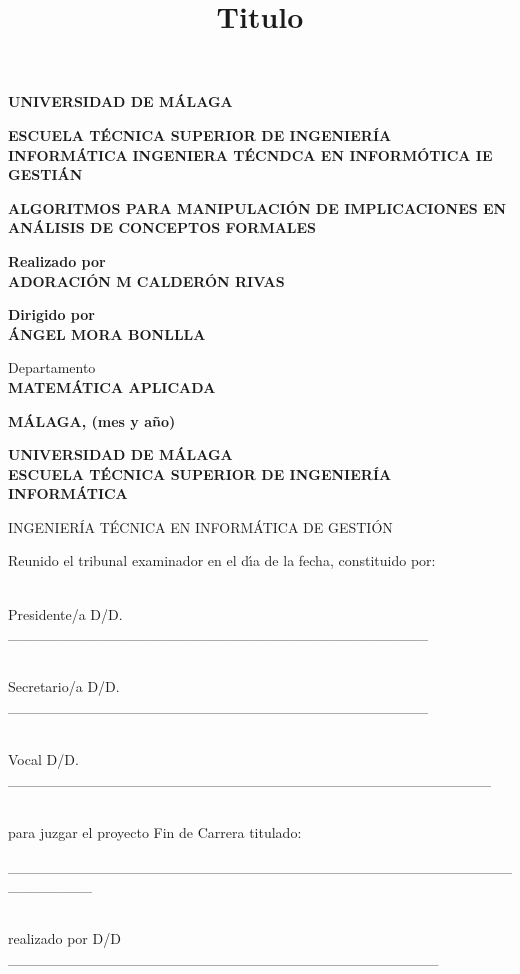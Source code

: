 \documentclass[12pt]{article}
\title{Titulo}
\begin{document}
\textbf{{\large UNIVERSIDAD DE M\'{A}LAGA}}

\textbf{ESCUELA T\'{E}CNICA SUPERIOR DE INGENIER\'{I}A INFORM\'{A}TICA}
\textbf {INGENIERA T\'{E}CNDCA EN INFORM\'{O}TICA IE GESTI\'{A}N}

\textbf{ALGORITMOS PARA MANIPULACI\'{O}N DE IMPLICACIONES EN AN\'{A}LISIS DE
CONCEPTOS FORMALES}

\textbf{Realizado por}
\\
\textbf{ADORACI\'{O}N M\textordfeminine{} CALDER\'{O}N RIVAS}

\textbf{Dirigido por}
\\
\textbf{\'{A}NGEL MORA BONLLLA}

Departamento
\\
\textbf{MATEM\'{A}TICA APLICADA}

\textbf{M\'{A}LAGA, (mes y a\~{n}o)}

\newpage

{\large \textbf{UNIVERSIDAD DE M\'{A}LAGA}
\\
\textbf{ESCUELA T\'{E}CNICA SUPERIOR DE INGENIER\'{I}A INFORM\'{A}TICA}}

INGENIER\'{I}A T\'{E}CNICA EN INFORM\'{A}TICA DE GESTI\'{O}N

Reunido el tribunal examinador en el d\'{\i}a de la fecha, constituido por:


\leavevmode \\
Presidente/a D\textordmasculine{}/D\textordfeminine{}.
\_\_\_\_\_\_\_\_\_\_\_\_\_\_\_\_\_\_\_\_\_\_\_\_\_\_\_\_\_\_\_\_\_\_\_\_\_\_\_\_


\leavevmode \\
Secretario/a D\textordmasculine{}/D\textordfeminine{}.
\_\_\_\_\_\_\_\_\_\_\_\_\_\_\_\_\_\_\_\_\_\_\_\_\_\_\_\_\_\_\_\_\_\_\_\_\_\_\_\_


\leavevmode \\
Vocal D\textordmasculine{}/D\textordfeminine{}.
\_\_\_\_\_\_\_\_\_\_\_\_\_\_\_\_\_\_\_\_\_\_\_\_\_\_\_\_\_\_\_\_\_\_\_\_\_\_\_\_\_\_\_\_\_\_


\leavevmode \\
para juzgar el proyecto Fin de Carrera titulado:

\_\_\_\_\_\_\_\_\_\_\_\_\_\_\_\_\_\_\_\_\_\_\_\_\_\_\_\_\_\_\_\_\_\_\_\_\_\_\_\_\_\_\_\_\_\_\_\_\_\_\_\_\_\_\_\_


\leavevmode \\
realizado por D\textordmasculine{}/D\textordfeminine{}
\_\_\_\_\_\_\_\_\_\_\_\_\_\_\_\_\_\_\_\_\_\_\_\_\_\_\_\_\_\_\_\_\_\_\_\_\_\_\_\_\_
\end{document}

